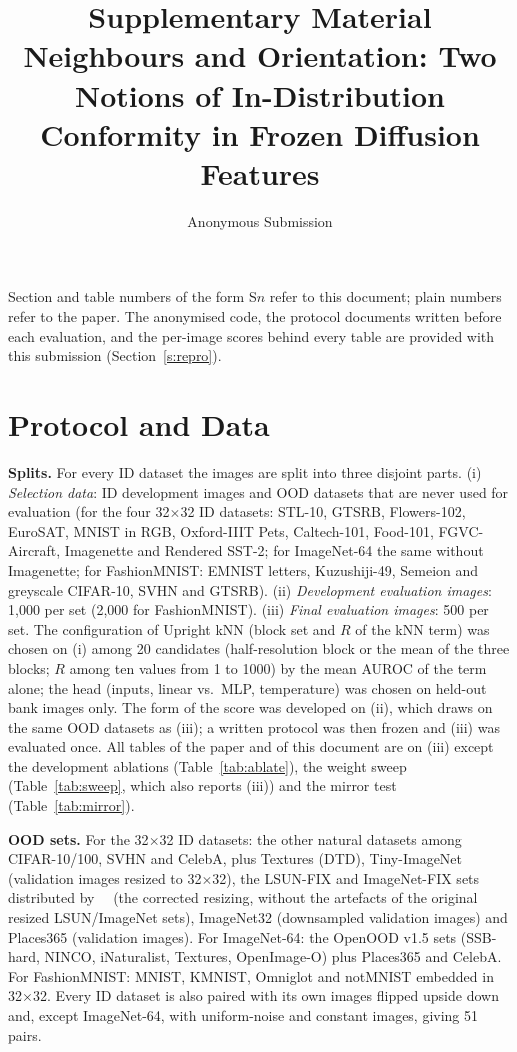 \documentclass[10pt]{article}
\title{Supplementary Material\\[2pt]\large Neighbours and Orientation: Two Notions of In-Distribution Conformity in Frozen Diffusion Features}
\author{Anonymous Submission}
\date{}
\begin{document}
\maketitle
\noindent Section and table numbers of the form S$n$ refer to this document; plain numbers refer to the paper. The anonymised code, the protocol documents written before each evaluation, and the per-image scores behind every table are provided with this submission (Section~\ref{s:repro}).

\section{Protocol and Data}
\label{s:protocol}
\textbf{Splits.} For every ID dataset the images are split into three disjoint parts. (i) \emph{Selection data}: ID development images and OOD datasets that are never used for evaluation (for the four 32$\times$32 ID datasets: STL-10, GTSRB, Flowers-102, EuroSAT, MNIST in RGB, Oxford-IIIT Pets, Caltech-101, Food-101, FGVC-Aircraft, Imagenette and Rendered SST-2; for ImageNet-64 the same without Imagenette; for FashionMNIST: EMNIST letters, Kuzushiji-49, Semeion and greyscale CIFAR-10, SVHN and GTSRB). (ii) \emph{Development evaluation images}: 1{,}000 per set (2{,}000 for FashionMNIST). (iii) \emph{Final evaluation images}: 500 per set. The configuration of Upright kNN (block set and $R$ of the kNN term) was chosen on (i) among 20 candidates (half-resolution block or the mean of the three blocks; $R$ among ten values from 1 to 1000) by the mean AUROC of the term alone; the head (inputs, linear vs.\ MLP, temperature) was chosen on held-out bank images only. The form of the score was developed on (ii), which draws on the same OOD datasets as (iii); a written protocol was then frozen and (iii) was evaluated once. All tables of the paper and of this document are on (iii) except the development ablations (Table~\ref{tab:ablate}), the weight sweep (Table~\ref{tab:sweep}, which also reports (iii)) and the mirror test (Table~\ref{tab:mirror}).

\textbf{OOD sets.} For the 32$\times$32 ID datasets: the other natural datasets among CIFAR-10/100, SVHN and CelebA, plus Textures (DTD), Tiny-ImageNet (validation images resized to 32$\times$32), the LSUN-FIX and ImageNet-FIX sets distributed by~\citeauthor{tack2020csi}~ (the corrected resizing, without the artefacts of the original resized LSUN/ImageNet sets), ImageNet32 (downsampled validation images) and Places365 (validation images). For ImageNet-64: the OpenOOD v1.5 sets (SSB-hard, NINCO, iNaturalist, Textures, OpenImage-O) plus Places365 and CelebA. For FashionMNIST: MNIST, KMNIST, Omniglot and notMNIST embedded in 32$\times$32. Every ID dataset is also paired with its own images flipped upside down and, except ImageNet-64, with uniform-noise and constant images, giving 51 pairs.
\end{document}
